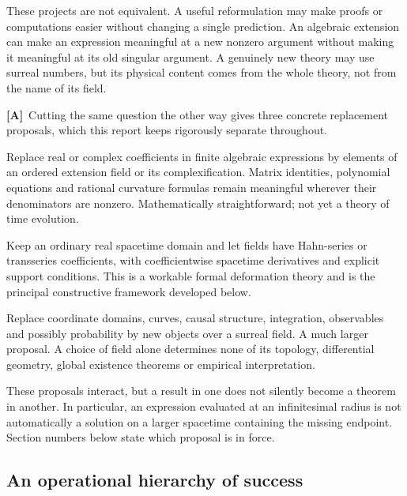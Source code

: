 \documentclass[11pt,letterpaper]{article}
\numberwithin{equation}{section}
\theoremstyle{definition}
\theoremstyle{remark}
\newcommand{\TA}{\textcolor{TierA}{\textsf{\bfseries[A]}}}
\begin{document}
These projects are not equivalent. A useful reformulation may make proofs or
computations easier without changing a single prediction. An algebraic
extension can make an expression meaningful at a new nonzero argument without
making it meaningful at its old singular argument. A genuinely new theory may
use surreal numbers, but its physical content comes from the whole theory, not
from the name of its field.

\TA\ Cutting the same question the other way gives three concrete replacement
proposals, which this report keeps rigorously separate throughout.
\begin{description}[style=nextline,leftmargin=0pt,labelsep=0pt]
\item[(P1) Algebraic scalar extension.]
Replace real or complex coefficients in finite algebraic expressions by
elements of an ordered extension field or its complexification. Matrix
identities, polynomial equations and rational curvature formulas remain
meaningful wherever their denominators are nonzero. Mathematically
straightforward; not yet a theory of time evolution.
\item[(P2) Fields with non-Archimedean coefficients on ordinary spacetime.]
Keep an ordinary real spacetime domain and let fields have Hahn-series or
transseries coefficients, with coefficientwise spacetime derivatives and
explicit support conditions. This is a workable formal deformation theory and
is the principal constructive framework developed below.
\item[(P3) A genuinely non-Archimedean spacetime.]
Replace coordinate domains, curves, causal structure, integration, observables
and possibly probability by new objects over a surreal field. A much larger
proposal. A choice of field alone determines none of its topology, differential
geometry, global existence theorems or empirical interpretation.
\end{description}
These proposals interact, but a result in one does not silently become a
theorem in another. In particular, an expression evaluated at an infinitesimal
radius is not automatically a solution on a larger spacetime containing the
missing endpoint. Section numbers below state which proposal is in force.

\subsection{An operational hierarchy of success}
\label{phys:sub:hierarchy}
\end{document}

